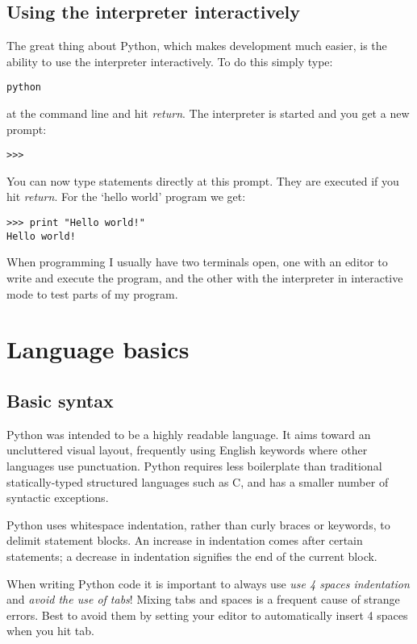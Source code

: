 \documentclass[10pt,a4paper]{article}
\begin{document}
\subsection{Using the interpreter interactively}
The great thing about Python, which makes development much easier, is the ability to use the interpreter interactively.
To do this simply type:
\begin{Verbatim}
python
\end{Verbatim}
at the command line and hit \emph{return}.
The interpreter is started and you get a new prompt:
\begin{lstlisting}
>>>
\end{lstlisting}
You can now type statements directly at this prompt.
They are executed if you hit \emph{return}.
For the `hello world' program we get:
\begin{lstlisting}
>>> print "Hello world!"
Hello world!
\end{lstlisting}
When programming I usually have two terminals open, one with an editor to write and execute the program, and the other with the interpreter in interactive mode to test parts of my program.
\section{Language basics}
\subsection{Basic syntax}
Python was intended to be a highly readable language. It aims toward an uncluttered visual layout, frequently using English keywords where other languages use punctuation. Python requires less boilerplate than traditional statically-typed structured languages such as C, and has a smaller number of syntactic exceptions.

Python uses whitespace indentation, rather than curly braces or keywords, to delimit statement blocks. An increase in indentation comes after certain statements; a decrease in indentation signifies the end of the current block.

When writing Python code it is important to always use \emph{use 4 spaces indentation} and \emph{avoid the use of tabs}! Mixing tabs and spaces is a frequent cause of strange errors. Best to avoid them by setting your editor to automatically insert 4 spaces when you hit tab.
\end{document}
